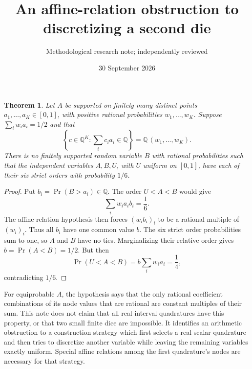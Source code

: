 \documentclass[11pt]{article}
\title{An affine-relation obstruction to discretizing a second die}
\author{Methodological research note; independently reviewed}
\date{30 September 2026}
\newtheorem{theorem}{Theorem}
\begin{document}
\maketitle
\begin{theorem}
Let $A$ be supported on finitely many distinct points
$a_1,\ldots,a_K\in[0,1]$, with positive rational probabilities
$w_1,\ldots,w_K$. Suppose $\sum_iw_i a_i=1/2$ and that
\[
 \left\{c\in\mathbb Q^K:\sum_i c_i a_i\in\mathbb Q\right\}
 =\mathbb Q\,(w_1,\ldots,w_K).
\]
There is no finitely supported random variable $B$ with rational
probabilities such that the independent variables $A,B,U$, with
$U$ uniform on $[0,1]$, have each of their six strict orders with
probability $1/6$.
\end{theorem}
\begin{proof}
Put $b_i=\Pr(B>a_i)\in\mathbb Q$. The order $U<A<B$ would give
\[
 \sum_iw_i a_i b_i=\frac16.
\]
The affine-relation hypothesis then forces
$(w_i b_i)_i$ to be a rational multiple of $(w_i)_i$.
Thus all $b_i$ have one common value $b$.
The six strict order probabilities sum to one, so $A$ and $B$ have
no ties. Marginalizing their relative order gives
$b=\Pr(A<B)=1/2$. But then
\[
 \Pr(U<A<B)=b\sum_iw_i a_i=\frac14,
\]
contradicting $1/6$.
\end{proof}

For equiprobable $A$, the hypothesis says that the only rational
coefficient combinations of its node values that are rational are
constant multiples of their sum. This note does not claim that all
real interval quadratures have this property, or that two small finite
dice are impossible. It identifies an arithmetic obstruction to a
construction strategy which first selects a real scalar quadrature and
then tries to discretize another variable while leaving the remaining
variables exactly uniform. Special affine relations among the first
quadrature's nodes are necessary for that strategy.
\end{document}
